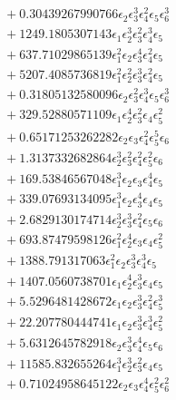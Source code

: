 \documentclass[10pt]{article}
\begin{document}
\begin{align*}
&{}  + 0.30439267990766 \epsilon_{2} \epsilon_{3}^{3} \epsilon_{4}^{2} \epsilon_{5} \epsilon_{6}^{3} \\
&{}  + 1249.1805307143 \epsilon_{1} \epsilon_{2}^{3} \epsilon_{3}^{2} \epsilon_{4}^{3} \epsilon_{5} \\
&{}  + 637.71029865139 \epsilon_{1}^{2} \epsilon_{2} \epsilon_{3}^{4} \epsilon_{4}^{2} \epsilon_{5} \\
&{}  + 5207.4085736819 \epsilon_{1}^{2} \epsilon_{2}^{2} \epsilon_{3}^{3} \epsilon_{4}^{2} \epsilon_{5} \\
&{}  + 0.31805132580096 \epsilon_{2} \epsilon_{3}^{2} \epsilon_{4}^{3} \epsilon_{5} \epsilon_{6}^{3} \\
&{}  + 329.52880571109 \epsilon_{1} \epsilon_{2}^{4} \epsilon_{3}^{2} \epsilon_{4} \epsilon_{5}^{2} \\
&{}  + 0.65171253262282 \epsilon_{2} \epsilon_{3} \epsilon_{4}^{2} \epsilon_{5}^{5} \epsilon_{6} \\
&{}  + 1.3137332682864 \epsilon_{2}^{3} \epsilon_{3}^{2} \epsilon_{4}^{2} \epsilon_{5}^{2} \epsilon_{6} \\
&{}  + 169.53846567048 \epsilon_{1}^{3} \epsilon_{2} \epsilon_{3} \epsilon_{4}^{4} \epsilon_{5} \\
&{}  + 339.07693134095 \epsilon_{1}^{3} \epsilon_{2} \epsilon_{3}^{4} \epsilon_{4} \epsilon_{5} \\
&{}  + 2.6829130174714 \epsilon_{2}^{3} \epsilon_{3}^{3} \epsilon_{4}^{2} \epsilon_{5} \epsilon_{6} \\
&{}  + 693.87479598126 \epsilon_{1}^{2} \epsilon_{2}^{4} \epsilon_{3} \epsilon_{4} \epsilon_{5}^{2} \\
&{}  + 1388.791317063 \epsilon_{1}^{2} \epsilon_{2} \epsilon_{3}^{3} \epsilon_{4}^{3} \epsilon_{5} \\
&{}  + 1407.0560738701 \epsilon_{1} \epsilon_{2}^{4} \epsilon_{3}^{3} \epsilon_{4} \epsilon_{5} \\
&{}  + 5.5296481428672 \epsilon_{1} \epsilon_{2} \epsilon_{3}^{3} \epsilon_{4}^{2} \epsilon_{5}^{3} \\
&{}  + 22.207780444741 \epsilon_{1} \epsilon_{2} \epsilon_{3}^{3} \epsilon_{4}^{3} \epsilon_{5}^{2} \\
&{}  + 5.6312645782918 \epsilon_{2} \epsilon_{3}^{3} \epsilon_{4}^{4} \epsilon_{5} \epsilon_{6} \\
&{}  + 11585.832655264 \epsilon_{1}^{3} \epsilon_{2}^{3} \epsilon_{3}^{2} \epsilon_{4} \epsilon_{5} \\
&{}  + 0.71024958645122 \epsilon_{2} \epsilon_{3} \epsilon_{4}^{4} \epsilon_{5}^{2} \epsilon_{6}^{2} \\

\end{align*}
\end{document}
